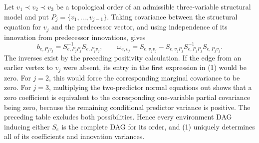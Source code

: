Let \(v_1\prec v_2\prec v_3\) be a topological order of an admissible three-variable structural model and put \(P_j=\{v_1,\ldots,v_{j-1}\}\). Taking covariance between the structural equation for \(v_j\) and the predecessor vector, and using independence of its innovation from predecessor innovations, gives
\[
 b_{e,P_jv_j}=S_{e,P_jP_j}^{-1}S_{e,P_jv_j},
 \qquad
 \omega_{e,v_j}=S_{e,v_jv_j}
 -S_{e,v_jP_j}S_{e,P_jP_j}^{-1}S_{e,P_jv_j}.
 \tag{1}
\]
The inverses exist by the preceding positivity calculation. If the edge from an earlier vertex to \(v_j\) were absent, its entry in the first expression in (1) would be zero. For \(j=2\), this would force the corresponding marginal covariance to be zero. For \(j=3\), multiplying the two-predictor normal equations out shows that a zero coefficient is equivalent to the corresponding one-variable partial covariance being zero, because the remaining conditional predictor variance is positive. The preceding table excludes both possibilities. Hence every environment DAG inducing either \(S_e\) is the complete DAG for its order, and (1) uniquely determines all of its coefficients and innovation variances.

